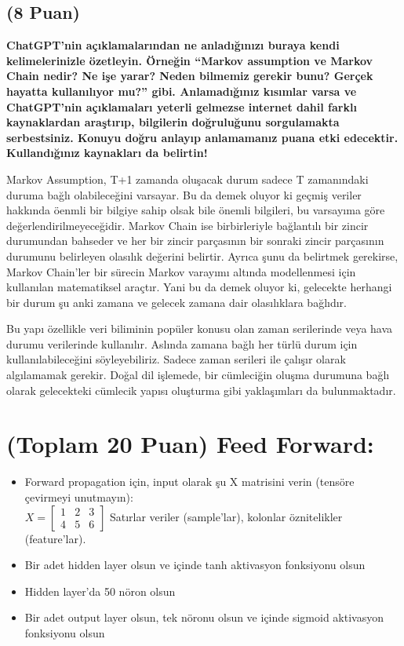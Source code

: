 \documentclass[11pt]{article}
\begin{document}
\subsection{(8 Puan)} \textbf{ChatGPT’nin açıklamalarından ne anladığınızı buraya kendi kelimelerinizle özetleyin. Örneğin ``Markov assumption ve Markov Chain nedir? Ne işe yarar? Neden bilmemiz gerekir bunu? Gerçek hayatta kullanılıyor mu?'' gibi. Anlamadığınız kısımlar varsa ve ChatGPT’nin açıklamaları yeterli gelmezse internet dahil farklı kaynaklardan araştırıp, bilgilerin doğruluğunu sorgulamakta serbestsiniz. Konuyu doğru anlayıp anlamamanız puana etki edecektir. Kullandığınız kaynakları da belirtin!}

Markov Assumption, T+1 zamanda oluşacak durum sadece T zamanındaki duruma bağlı olabileceğini varsayar. Bu da 
demek oluyor ki geçmiş veriler hakkında öenmli bir bilgiye sahip olsak bile önemli bilgileri, bu varsayıma göre değerlendirilmeyeceğidir. Markov Chain ise birbirleriyle bağlantılı bir zincir durumundan bahseder ve her bir zincir parçasının bir sonraki zincir parçasının durumunu belirleyen olasılık değerini belirtir. Ayrıca şunu da belirtmek gerekirse, Markov Chain'ler bir sürecin Markov varayımı altında modellenmesi için kullanılan matematiksel araçtır. Yani bu da demek oluyor ki, gelecekte herhangi bir durum şu anki zamana ve gelecek zamana dair olasılıklara bağlıdır.

Bu yapı özellikle veri biliminin popüler konusu olan zaman serilerinde veya hava durumu verilerinde kullanılır. Aslında zamana bağlı her türlü durum için kullanılabileceğini söyleyebiliriz. Sadece zaman serileri ile çalışır olarak algılamamak gerekir. Doğal dil işlemede, bir cümleciğin oluşma durumuna bağlı olarak gelecekteki cümlecik yapısı oluşturma gibi yaklaşımları da bulunmaktadır. 
\section{(Toplam 20 Puan) Feed Forward:}
 
\begin{itemize}
    \item Forward propagation için, input olarak şu X matrisini verin (tensöre çevirmeyi unutmayın):\\
    $X = \begin{bmatrix}
        1 & 2 & 3\\
        4 & 5 & 6
        \end{bmatrix}$
    Satırlar veriler (sample'lar), kolonlar öznitelikler (feature'lar).
    \item Bir adet hidden layer olsun ve içinde tanh aktivasyon fonksiyonu olsun
    \item Hidden layer'da 50 nöron olsun
    \item Bir adet output layer olsun, tek nöronu olsun ve içinde sigmoid aktivasyon fonksiyonu olsun
\end{itemize}
\end{document}
